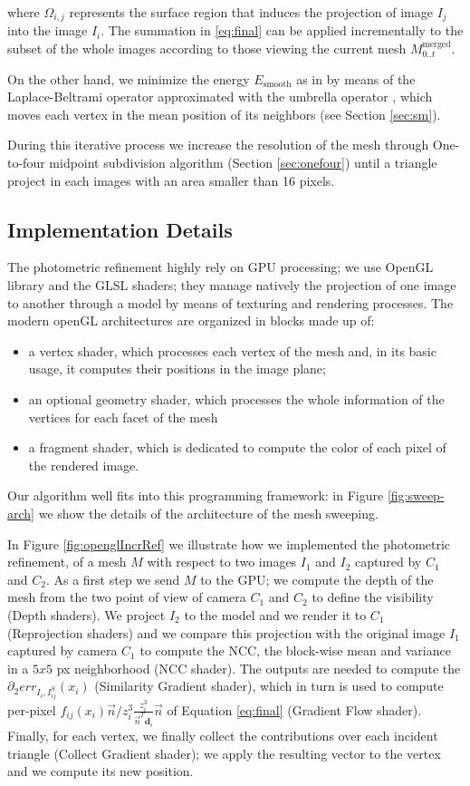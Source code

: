 where $\Omega_{i,j}$ represents the surface region that induces the projection of image $I_j$ into the image $I_i$.
The summation in \eqref{eq:final} can be applied incrementally to the subset of the whole images according to those viewing the current mesh $M_{0..t}^{\text{merged}}$.

On the other hand, we minimize the energy $E_{\textrm{smooth}}$ as in \cite{vu_et_al_2012} by means of the Laplace-Beltrami operator approximated with the umbrella operator \cite{wardetzky2007discrete}, which moves each vertex in the mean position of its neighbors (see Section \ref{sec:sm}).

During this iterative process we increase the resolution of the mesh through One-to-four midpoint subdivision algorithm (Section \ref{sec:onefour}) until a triangle project in each images with an area smaller than 16 pixels.
\subsection{Implementation Details}
The photometric refinement highly rely on GPU processing; we use OpenGL library \cite{opengl} and the GLSL shaders; they manage natively the projection of one image to another through a model by means of texturing and rendering processes.
The modern openGL architectures are organized in blocks made up of:
\begin{itemize}
 \item a vertex shader, which processes each vertex of the mesh and, in its basic usage, it computes their positions in the image plane;
 \item an optional geometry shader, which processes the whole information of the vertices for each facet of the mesh
 \item a fragment shader, which is dedicated to compute the color of each pixel of the rendered image.
\end{itemize}
Our algorithm well fits into this programming framework: in Figure \ref{fig:sweep-arch} we show the details of the architecture of the mesh sweeping. 

In Figure \ref{fig:openglIncrRef} we illustrate how we implemented the photometric refinement, of a mesh $\mathit{M}$ with respect to two images $I_{1}$ and $I_{2}$ captured by $C_{1}$ and $C_{2}$.
As a first step we send $\mathit{M}$  to  the GPU; we compute the depth of the mesh from the two point of view of camera $C_{1}$ and $C_{2}$ to define the visibility (Depth shaders).
We project $I_{2}$ to the model and we render it to $C_{1}$ (Reprojection shaders) and we compare this projection with the original image $I_{1}$ captured by camera $C_{1}$ to compute the NCC, the block-wise mean and variance  in a $5x5$ px neighborhood (NCC shader). The outputs are needed to compute the $\partial_2 err_{I_i, I_{ij}^{\mathit{S}}}(x_i)$ (Similarity Gradient shader), which in turn is used to compute per-pixel $f_{ij}(x_i)  \overrightarrow{n}/z_i^3 \frac{z_i^3}{\overrightarrow{n}^T \mathbf{d}_i }\overrightarrow{n}$ of Equation \eqref{eq:final} (Gradient Flow shader). 
Finally, for each vertex, we finally collect the contributions over each incident triangle (Collect Gradient shader); we apply the resulting vector to the vertex and we compute its new position.


